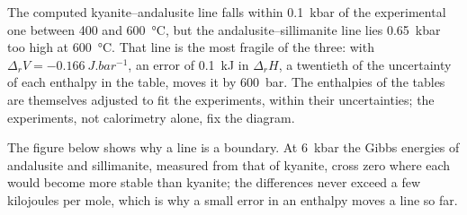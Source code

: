 The computed kyanite--andalusite line falls within \qty{0.1}{kbar} of the experimental
one between 400 and \qty{600}{\celsius}, but the andalusite--sillimanite line lies
\qty{0.65}{kbar} too high at \qty{600}{\celsius}. That line is the most fragile of the
three: with $\Delta_r V = \qty{-0.166}{J.bar^{-1}}$, an error of \qty{0.1}{kJ} in
$\Delta_r H$, a twentieth of the uncertainty of each enthalpy in the table, moves it by
\qty{600}{bar}. The enthalpies of the tables are themselves adjusted to fit the
experiments, within their uncertainties; the experiments, not calorimetry alone, fix the
diagram.

The figure below shows why a line is a boundary. At \qty{6}{kbar} the Gibbs energies of
andalusite and sillimanite, measured from that of kyanite, cross zero where each would
become more stable than kyanite; the differences never exceed a few kilojoules per mole,
which is why a small error in an enthalpy moves a line so far.

\begin{omfigure}
\centering
{}
\par{}
\end{omfigure}

